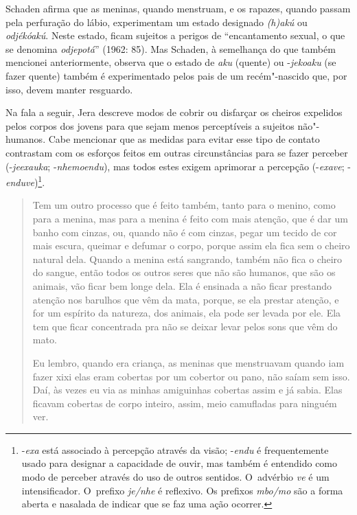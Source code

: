 Schaden afirma que as meninas, quando menstruam, e os rapazes, quando
passam pela perfuração do lábio, experimentam um estado designado
\emph{(h)akú} ou \emph{odjékóakú}. Neste estado, ficam sujeitos a perigos de
``encantamento sexual, o que se denomina \emph{odjepotá}'' (1962: 85). Mas
Schaden, à semelhança do que também mencionei anteriormente, observa
que o estado de \emph{aku} (quente) ou -\emph{jekoaku} (se fazer quente) também é
experimentado pelos pais de um recém"-nascido que, por isso, devem
manter resguardo. 

Na fala a seguir, Jera descreve modos de cobrir ou disfarçar os cheiros
expelidos pelos corpos dos jovens para que sejam menos perceptíveis a
sujeitos não"-humanos. Cabe mencionar que as medidas para evitar esse
tipo de contato contrastam com os esforços feitos em outras
circunstâncias para se fazer perceber (\mbox{-\emph{jeexauka}}; \mbox{-\emph{nhemoendu}}), mas
todos estes exigem aprimorar a percepção (-\emph{exave};
-\emph{enduve})\footnote[12]{-\emph{exa} está associado à percepção através da visão;
-\emph{endu} é frequentemente usado para designar a capacidade de ouvir, mas
também é entendido como modo de perceber através do uso de outros
sentidos. O~advérbio \emph{ve} é um intensificador. O~prefixo \emph{je/nhe} é
reflexivo. Os prefixos \emph{mbo/mo} são a forma aberta e nasalada de indicar
que se faz uma ação ocorrer. }. 

\begin{quote}
\noindent
Tem um outro processo que é feito também, tanto para o menino, como para
a menina, mas para a menina é feito com mais atenção, que é dar um
banho com cinzas, ou, quando não é com cinzas, pegar um tecido de cor
mais escura, queimar e defumar o corpo, porque assim ela fica sem o
cheiro natural dela. Quando a menina está sangrando, também não fica o
cheiro do sangue, então todos os outros seres que não são humanos, que
são os animais, vão ficar bem longe dela. Ela é ensinada a não ficar
prestando atenção nos barulhos que vêm da mata, porque, se ela prestar
atenção, e for um espírito da natureza, dos animais, ela pode ser
levada por ele. Ela tem que ficar concentrada pra não se deixar levar
pelos sons que vêm do mato.

\noindent
Eu lembro, quando era criança, as meninas que menstruavam quando iam
fazer xixi elas eram cobertas por um cobertor ou pano, não saíam sem
isso. Daí, às vezes eu via as minhas amiguinhas cobertas assim e já
sabia. Elas ficavam cobertas de corpo inteiro, assim, meio camufladas
para ninguém ver.
\end{quote}

